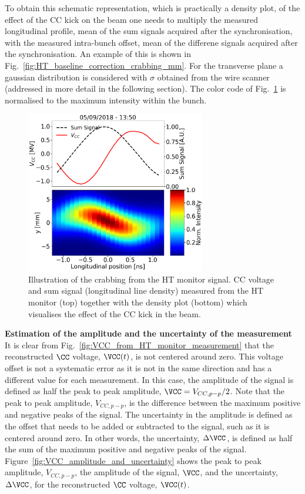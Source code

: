 To obtain this schematic representation, which is practically a density plot, of the effect of the CC kick on the beam one needs to multiply the measured longitudinal profile, mean of the sum signals acquired after the synchronisation, with the measured intra-bunch offset, mean of the differene signals acquired after the synchronisation. An example of this is shown in Fig.~\ref{fig:HT_baseline_correction_crabbing_mm}. For the transverse plane a gaussian distribution is considered with $\sigma$ obtained from the wire scanner (addressed in more detail in the following section). The color code of Fig.~\ref{fig:crabbing_reconstruction_HT_monitor} is normalised to the maximum intensity within the bunch.

\begin{figure}[!h]
   \centering         
   \includegraphics[width=0.7\textwidth]{images/Ch4/HT_crabVoltage__20180530_135105_crabbing_only.png}
       \caption{Illustration of the crabbing from the HT monitor signal. CC voltage and sum signal (longitudinal line density) measured from the HT monitor (top) together with the density plot (bottom) which visualises the effect of the CC kick in the beam.}
       \label{fig:crabbing_reconstruction_HT_monitor}
\end{figure}
   

\normalsize{\textbf{Estimation of the amplitude and the uncertainty of the measurement}}\\
It is clear from Fig.~\ref{fig:VCC_from_HT_monitor_measurement} that the reconstructed $\CC$ voltage, $\VCC(t)$, is not centered around zero. This voltage offset is not a systematic error as it is not in the same direction and has a different value for each measurement. In this case, the amplitude of the signal is defined as half the peak to peak amplitude, $\VCC = V_{CC, p-p}/2$. Note that the peak to peak amplitude, $V_{CC, p-p}$, is the difference between the maximum positive and negative peaks of the signal. The uncertainty in the amplitude is defined as the offset that needs to be added or subtracted to the signal, such as it is centered around zero. In other words, the uncertainty, $\Delta \VCC$, is defined as half the sum of the maximum positive and negative peaks of the signal. Figure~\ref{fig:VCC_amplitude_and_uncertainty} shows the peak to peak amplitude, $V_{CC, p-p}$, the amplitude of the signal, $\VCC$, and the uncertainty, $\Delta \VCC$, for the reconstructed $\CC$ voltage, $\VCC(t)$.

